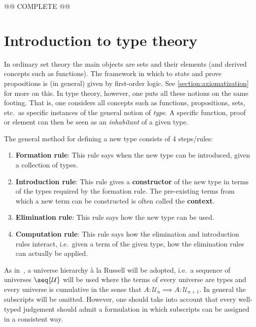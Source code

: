     @@ COMPLETE @@

\section{Introduction to type theory}

    In ordinary set theory the main objects are sets and their elements (and derived concepts such as functions). The framework in which to state and prove propositions is (in general) given by first-order logic. See \cref{section:axiomatization} for more on this. In type theory, however, one puts all these notions on the same footing. That is, one considers all concepts such as functions, propositions, sets, etc.~as specific instances of the general notion of \textit{type}. A specific function, proof or element can then be seen as an \textit{inhabitant} of a given type.

    \begin{method}
        The general method for defining a new type consists of 4 steps/rules:
        \begin{enumerate}
            \item \textbf{Formation rule}: This rule says when the new type can be introduced, given a collection of types.
            \item \textbf{Introduction rule}: This rule gives a \textbf{constructor} of the new type in terms of the types required by the formation rule. The pre-existing terms from which a new term can be constructed is often called the \textbf{context}.
            \item \textbf{Elimination rule}: This rule says how the new type can be used.
            \item \textbf{Computation rule}: This rule says how the elimination and introduction rules interact, i.e.~given a term of the given type, how the elimination rules can actually be applied.
        \end{enumerate}
    \end{method}

    As in~\citet{the_univalent_foundations_program_homotopy_2013}, a universe hierarchy \`a la Russell will be adopted, i.e.~a sequence of universes $\seq{\mathcal{U}}$ will be used where the terms of every universe are types and every universe is cumulative in the sense that $A:\mathcal{U}_n\implies A:\mathcal{U}_{n+1}$. In general the subscripts will be omitted. However, one should take into account that every well-typed judgement should admit a formulation in which subscripts can be assigned in a consistent way.

